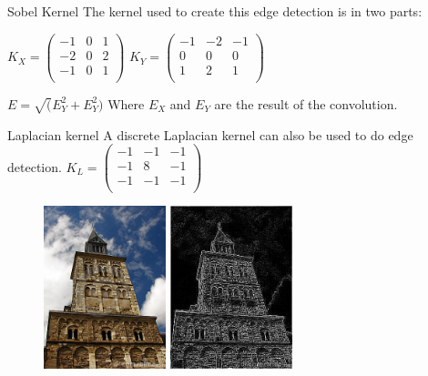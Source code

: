 \documentclass{beamer}
\begin{document}
\begin{frame}{Sobel Kernel}
The kernel used to create this edge detection is in two parts:


$K_X = \begin{pmatrix}
	-1 & 0 & 1\\
	-2 & 0 & 2\\
	-1 & 0 & 1\\
\end{pmatrix}$
$K_Y = \begin{pmatrix}
	-1 & -2 & -1\\
	0 & 0 & 0\\
	1 & 2 & 1\\
\end{pmatrix}$

\vspace{.4in}
$E = \sqrt(E_Y^2+E_Y^2)$ Where $E_X$ and $E_Y$ are the result of the convolution.
\end{frame}

\begin{frame}{Laplacian kernel}
A discrete Laplacian kernel can also be used to do edge detection. 
$K_L = \begin{pmatrix}
	-1 & -1 & -1\\
	-1 & 8 & -1\\
	-1 & -1 & -1\\
\end{pmatrix}$
\begin{figure}[ht]
\includegraphics[width=1.4in]{churchin.jpg}
\hspace{.1in}
\includegraphics[width=1.4in]{churchoutlaplace.jpg}
\hspace{.1in}
\end{figure}

\end{frame}
\end{document}
